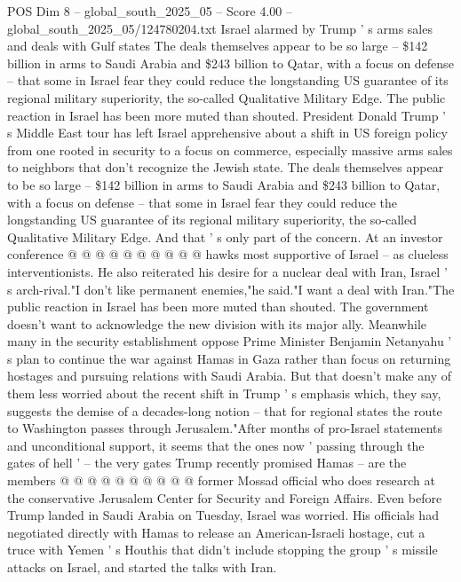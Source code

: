 \begin{textsample}{POS Dim 8 – global\_south\_2025\_05 – Score 4.00 – global\_south\_2025\_05/124780204.txt}  \label{ex:f8_pos_439}
Israel alarmed by Trump ' s arms sales and deals with Gulf states The deals themselves appear to be so large -- \$142 billion in arms to Saudi Arabia and \$243 billion to Qatar, with a focus on defense -- that some in Israel fear they could reduce the longstanding US guarantee of its regional military superiority, the so-called Qualitative Military Edge.
The public reaction in Israel has been more muted than shouted.
President Donald Trump ' s Middle East tour has left Israel apprehensive about a shift in US foreign policy from one rooted in security to a focus on commerce, especially massive arms sales to neighbors that don't recognize the Jewish state.
The deals themselves appear to be so large -- \$142 billion in arms to Saudi Arabia and \$243 billion to Qatar, with a focus on defense -- that some in Israel fear they could reduce the longstanding US guarantee of its regional military superiority, the so-called Qualitative Military Edge.
And that ' s only part of the concern.
At an investor conference @ @ @ @ @ @ @ @ @ @ hawks most supportive of Israel -- as clueless interventionists.
He also reiterated his desire for a nuclear deal with Iran, Israel ' s arch-rival."I don't like permanent enemies,"he said."I want a deal with Iran."The public reaction in Israel has been more muted than shouted.
The government doesn't want to acknowledge the new division with its major ally.
Meanwhile many in the security establishment oppose Prime Minister Benjamin Netanyahu ' s plan to continue the war against Hamas in Gaza rather than focus on returning hostages and pursuing relations with Saudi Arabia.
But that doesn't make any of them less worried about the recent shift in Trump ' s emphasis which, they say, suggests the demise of a decades-long notion -- that for regional states the route to Washington passes through Jerusalem."After months of pro-Israel statements and unconditional support, it seems that the ones now ' passing through the gates of hell ' -- the very gates Trump recently promised Hamas -- are the members @ @ @ @ @ @ @ @ @ @ former Mossad official who does research at the conservative Jerusalem Center for Security and Foreign Affairs.
Even before Trump landed in Saudi Arabia on Tuesday, Israel was worried.
His officials had negotiated directly with Hamas to release an American-Israeli hostage, cut a truce with Yemen ' s Houthis that didn't include stopping the group ' s missile attacks on Israel, and started the talks with Iran.

\end{textsample}
